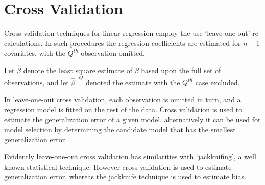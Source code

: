 \documentclass[a4paper,12pt]{article}
\begin{document}
\section{Cross Validation} %


Cross validation techniques for linear regression employ the use `leave one out' re-calculations. In such procedures the regression coefficients are estimated for $n-1$ covariates, with the $Q^{th}$ observation omitted.


Let $\hat{\beta}$ denote the least square estimate of $\beta$ based upon the full set of observations, and let
$\hat{\beta}^{-Q}$ denoted the estimate with the $Q^{th}$ case
excluded.




In leave-one-out cross validation, each observation is omitted in turn, and a regression model is fitted on the rest of the data. Cross validation is used to estimate the generalization error of a given model. alternatively it can be used for model selection by determining the candidate model that has the smallest generalization error.




Evidently leave-one-out cross validation has similarities with `jackknifing', a well known statistical technique. However cross validation is used to estimate generalization error, whereas the jackknife technique is used to estimate bias.
\end{document}
